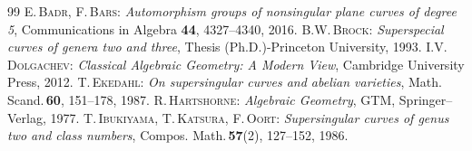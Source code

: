 \documentclass{article}
\theoremstyle{definition}
\begin{document}
\vfill
\begin{thebibliography}{99}\vspace{-1mm}
 \textsc{E.\,Badr, F\hspace{-0.2mm}.\,Bars}: \textit{Automorphism groups of nonsingular plane curves of degree 5}, Communications in Algebra {\bf 44}, 4327--4340, 2016.\vspace{-1mm}
 \textsc{B.\hspace{0.3mm}W\hspace{-0.4mm}.\,Brock}: \textit{Superspecial curves of genera two and three}, Thesis (Ph.D.)-Princeton \hspace{-0.2mm}University, 1993.\vspace{-1mm}
 \textsc{I.\hspace{0.4mm}V\hspace{-0.3mm}.\,Dolgachev}: \textit{Classical Algebraic Geometry: \hspace{-0.2mm}A \hspace{-0.2mm}Modern \hspace{-0.2mm}View}, \hspace{0.2mm}Cambridge University Press, 2012.\vspace{-1mm}
 \textsc{T.\,Ekedahl}: \textit{On supersingular curves and abelian varieties}, Math.\,Scand.\,{\bf 60}, 151--178, 1987.\vspace{-1mm}
 \textsc{R.\,Hartshorne}: \textit{Algebraic Geometry}, GTM\hspace{0.7mm}{\bf 52}, Springer--Verlag, 1977.\vspace{-1mm}
 \textsc{T\hspace{-0.2mm}.\,Ibukiyama, \hspace{-0.2mm}T\hspace{-0.2mm}.\,Katsura, F.\,Oort}: \textit{Supersingular curves of genus two and class numbers}, Compos. Math.\,{\bf 57}(2), 127--152, 1986.\vspace{-1mm}

\end{thebibliography}
\end{document}
